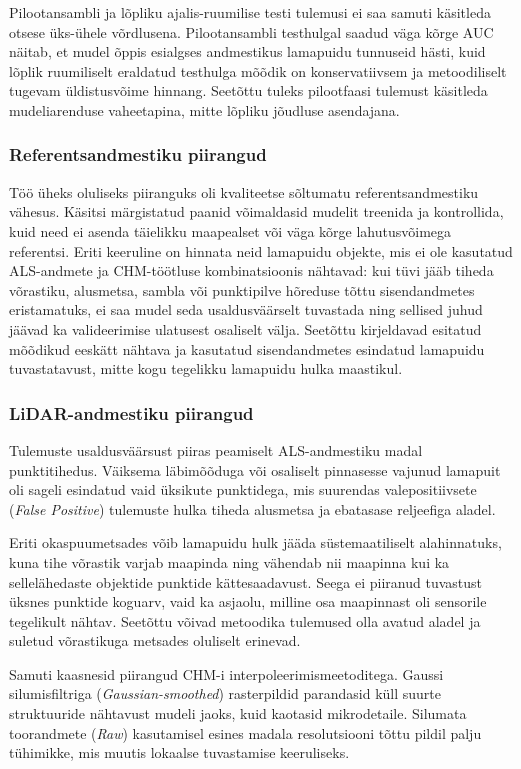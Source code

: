 Pilootansambli ja lõpliku ajalis-ruumilise testi tulemusi ei saa samuti käsitleda otsese üks-ühele võrdlusena. Pilootansambli testhulgal saadud väga kõrge AUC näitab, et mudel õppis esialgses andmestikus lamapuidu tunnuseid hästi, kuid lõplik ruumiliselt eraldatud testhulga mõõdik on konservatiivsem ja metoodiliselt tugevam üldistusvõime hinnang. Seetõttu tuleks pilootfaasi tulemust käsitleda mudeliarenduse vaheetapina, mitte lõpliku jõudluse asendajana.

\subsubsection{Referentsandmestiku piirangud}
Töö üheks oluliseks piiranguks oli kvaliteetse sõltumatu referentsandmestiku vähesus. Käsitsi märgistatud paanid võimaldasid mudelit treenida ja kontrollida, kuid need ei asenda täielikku maapealset või väga kõrge lahutusvõimega referentsi. Eriti keeruline on hinnata neid lamapuidu objekte, mis ei ole kasutatud ALS-andmete ja CHM-töötluse kombinatsioonis nähtavad: kui tüvi jääb tiheda võrastiku, alusmetsa, sambla või punktipilve hõreduse tõttu sisendandmetes eristamatuks, ei saa mudel seda usaldusväärselt tuvastada ning sellised juhud jäävad ka valideerimise ulatusest osaliselt välja. Seetõttu kirjeldavad esitatud mõõdikud eeskätt nähtava ja kasutatud sisendandmetes esindatud lamapuidu tuvastatavust, mitte kogu tegelikku lamapuidu hulka maastikul.

\subsubsection{LiDAR-andmestiku piirangud}
Tulemuste usaldusväärsust piiras peamiselt ALS-andmestiku madal punktitihedus. Väiksema läbimõõduga või osaliselt pinnasesse vajunud lamapuit oli sageli esindatud vaid üksikute punktidega, mis suurendas valepositiivsete (\textit{False Positive}) tulemuste hulka tiheda alusmetsa ja ebatasase reljeefiga aladel. 

Eriti okaspuumetsades võib lamapuidu hulk jääda süstemaatiliselt alahinnatuks, kuna tihe võrastik varjab maapinda ning vähendab nii maapinna kui ka sellelähedaste objektide punktide kättesaadavust. Seega ei piiranud tuvastust üksnes punktide koguarv, vaid ka asjaolu, milline osa maapinnast oli sensorile tegelikult nähtav. Seetõttu võivad metoodika tulemused olla avatud aladel ja suletud võrastikuga metsades oluliselt erinevad.

Samuti kaasnesid piirangud CHM-i interpoleerimismeetoditega. Gaussi silumisfiltriga (\textit{Gaussian-smoothed}) rasterpildid parandasid küll suurte struktuuride nähtavust mudeli jaoks, kuid kaotasid mikrodetaile. Silumata toorandmete (\textit{Raw}) kasutamisel esines madala resolutsiooni tõttu pildil palju tühimikke, mis muutis lokaalse tuvastamise keeruliseks.


